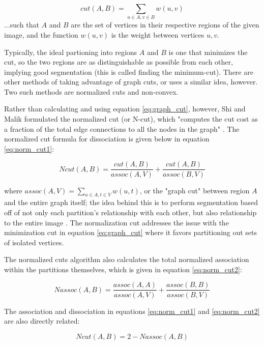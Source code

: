 \documentclass{article}
\begin{document}
\begin{equation}
cut(A,B) = \sum_{u\in A,v\in B} w(u,v)
\label{eq:graph_cut}
\end{equation}
...such that $A$ and $B$ are the set of vertices in their respective regions of the given image, and the function $w(u,v)$ is the weight between vertices $u,v$.

Typically, the ideal partioning into regions $A$ and $B$ is one that minimizes the cut, so the two regions are as distinguishable as possible from each other, implying good segmentation (this is called finding the minimum-cut). There are other methods of taking advantage of graph cuts, or uses a similar idea, however. Two such methods are normalized cuts and non-convex.

Rather than calculating and using equation \ref{eq:graph_cut}, however, Shi and Malik formulated the normalized cut (or N-cut), which "computes the cut cost as a fraction of the total edge connections to all the nodes in the graph" \cite{ncut}. The normalized cut formula for dissociation is given below in equation \ref{eq:norm_cut1}: \cite{ncut}

\begin{equation}
Ncut(A,B) = \frac{cut(A,B)}{assoc(A,V)} + \frac{cut(A,B)}{assoc(B,V)}
\label{eq:norm_cut1}
\end{equation}

where $assoc(A,V) = \sum_{u\in A, t\in V} w(u,t)$, or the "graph cut" between region $A$ and the entire graph itself; the idea behind this is to perform segmentation based off of not only each partition's relationship with each other, but also relationship to the entire image \cite{ncut}. The normalization cut addresses the issue with the minimization cut in equation \ref{eq:graph_cut} where it favors partitioning out sets of isolated vertices.

The normalized cuts algorithm also calculates the total normalized association within the partitions themselves, which is given in equation \ref{eq:norm_cut2}: \cite{ncut}

\begin{equation}
Nassoc(A,B) = \frac{assoc(A,A)}{assoc(A,V)} + \frac{assoc(B,B)}{assoc(B,V)}
\label{eq:norm_cut2}
\end{equation}

The association and dissociation in equations \ref{eq:norm_cut1} and \ref{eq:norm_cut2} are also directly related: \cite{ncut}

\begin{equation}
Ncut(A,B) = 2 - Nassoc(A,B)
\end{equation}
\end{document}
